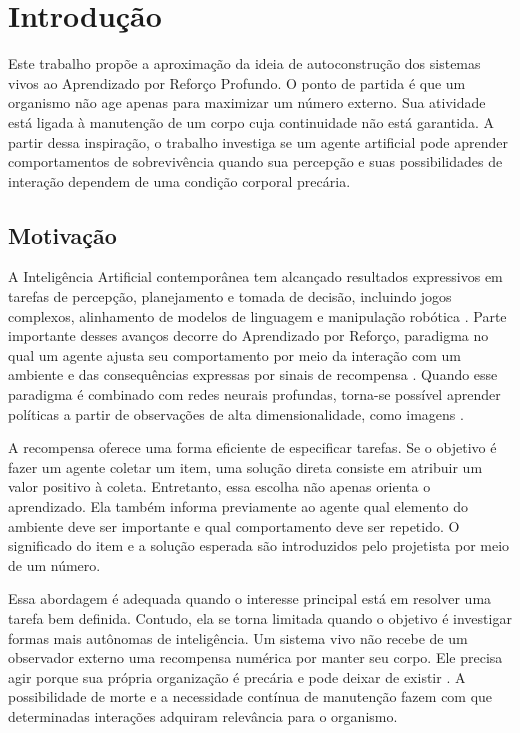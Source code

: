 \chapter{Introdução}
\label{cap:introducao}

Este trabalho propõe a aproximação da ideia de autoconstrução dos sistemas vivos ao Aprendizado por Reforço Profundo. O ponto de partida é que um organismo não age apenas para maximizar um número externo. Sua atividade está ligada à manutenção de um corpo cuja continuidade não está garantida. A partir dessa inspiração, o trabalho investiga se um agente artificial pode aprender comportamentos de sobrevivência quando sua percepção e suas possibilidades de interação dependem de uma condição corporal precária.

\section{Motivação}

A Inteligência Artificial contemporânea tem alcançado resultados expressivos em tarefas de percepção, planejamento e tomada de decisão, incluindo jogos complexos, alinhamento de modelos de linguagem e manipulação robótica \cite{dota,rlhf,clothppo}. Parte importante desses avanços decorre do Aprendizado por Reforço, paradigma no qual um agente ajusta seu comportamento por meio da interação com um ambiente e das consequências expressas por sinais de recompensa \cite{SuttonBarto2018}. Quando esse paradigma é combinado com redes neurais profundas, torna-se possível aprender políticas a partir de observações de alta dimensionalidade, como imagens \cite{mnih-2013,mnih-2015}.

A recompensa oferece uma forma eficiente de especificar tarefas. Se o objetivo é fazer um agente coletar um item, uma solução direta consiste em atribuir um valor positivo à coleta. Entretanto, essa escolha não apenas orienta o aprendizado. Ela também informa previamente ao agente qual elemento do ambiente deve ser importante e qual comportamento deve ser repetido. O significado do item e a solução esperada são introduzidos pelo projetista por meio de um número.

Essa abordagem é adequada quando o interesse principal está em resolver uma tarefa bem definida. Contudo, ela se torna limitada quando o objetivo é investigar formas mais autônomas de inteligência. Um sistema vivo não recebe de um observador externo uma recompensa numérica por manter seu corpo. Ele precisa agir porque sua própria organização é precária e pode deixar de existir \cite{varela1991intentionality}. A possibilidade de morte e a necessidade contínua de manutenção fazem com que determinadas interações adquiram relevância para o organismo.


